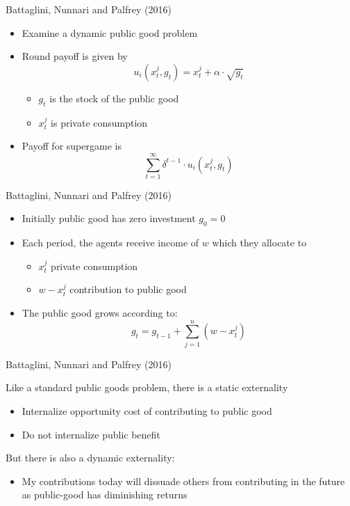 \documentclass{beamer}
\begin{document}
\begin{frame}{Battaglini, Nunnari and Palfrey (2016)}
\begin{card}
    \begin{itemize}
    	\item Examine a dynamic public good problem
    	\item Round payoff is given by
    	$$ u_i(x^j_t,g_t)=x^j_t+\alpha \cdot \sqrt{g_t}$$
        	\begin{itemize}
        	\item $g_t$ is the stock of the public good
        	\item $x^j_t$ is private consumption
        	\end{itemize}
    	\item Payoff for supergame is
    	$$ \sum_{t=1}^{\infty} \delta^{t-1} \cdot u_i(x^j_t,g_t) $$
    \end{itemize}
\end{card}
\end{frame}

\begin{frame}{Battaglini, Nunnari and Palfrey (2016)}
\begin{card}
\begin{itemize}
	\item Initially public good has zero investment $g_0=0$
	\item Each period, the agents receive income of $w$ which they allocate to
	\begin{itemize}
		\item $x^j_t$ private consumption
		\item $w-x^j_t$ contribution to public good
	\end{itemize}\pause
	\item The public good grows according to:
	$$ g_t=g_{t-1}+\sum^n_{j=1} (w-x^j_t)$$
\end{itemize}
\end{card}
\end{frame}

\begin{frame}{Battaglini, Nunnari and Palfrey (2016)}
\begin{card}
Like a standard public goods problem, there is a static externality
		\begin{itemize}
			\item Internalize opportunity cost of contributing to public good
			\item Do not internalize public benefit
		\end{itemize}
\end{card}
		\pause
    \begin{card}
    But there is also a dynamic externality:
    	\begin{itemize}
    		\item My contributions today will dissuade others from contributing in the future as public-good has diminishing returns
    	\end{itemize}
    \end{card}
\end{frame}
\end{document}
